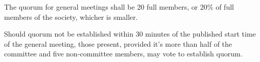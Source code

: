 \begin{clause}
  The quorum for general meetings shall be 20 full members, or 20\% of full members of the society, whicher is smaller.
\end{clause}

\begin{subclause}
  Should quorum not be established within 30 minutes of the published start time of the general meeting, those present, provided it's more than half of the committee and five non-committee members, may vote to establish quorum.
\end{subclause}